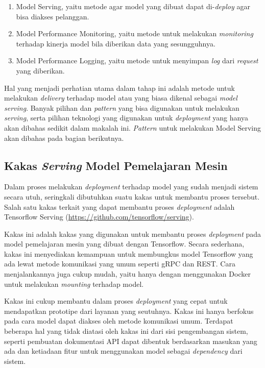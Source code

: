 \begin{enumerate}
  \item Model Serving, yaitu metode agar model yang dibuat dapat di-\textit{deploy} agar bisa diakses pelanggan.
  \item Model Performance Monitoring, yaitu metode untuk melakukan \textit{monitoring} terhadap kinerja model bila diberikan data yang sesungguhnya.
  \item Model Performance Logging, yaitu metode untuk menyimpan \textit{log} dari \textit{request} yang diberikan.
\end{enumerate}

Hal yang menjadi perhatian utama dalam tahap ini adalah metode untuk melakukan \textit{delivery} terhadap model atau yang biasa dikenal sebagai \textit{model serving}.
Banyak pilihan dan \textit{pattern} yang bisa digunakan untuk melakukan \textit{serving}, serta pilihan teknologi yang digunakan untuk \textit{deployment} yang hanya akan dibahas sedikit dalam makalah ini.
\textit{Pattern} untuk melakukan Model Serving akan dibahas pada bagian berikutnya.

\subsection{Kakas \textit{Serving} Model Pemelajaran Mesin}

Dalam proses melakukan \textit{deployment} terhadap model yang sudah menjadi sistem secara utuh, seringkali dibutuhkan suatu kakas untuk membantu proses tersebut.
Salah satu kakas terkait yang dapat membantu proses \textit{deployment} adalah Tensorflow Serving (\href{https://github.com/tensorflow/serving}{https://github.com/tensorflow/serving}).

Kakas ini adalah kakas yang digunakan untuk membantu proses \textit{deployment} pada model pemelajaran mesin yang dibuat dengan Tensorflow.
Secara sederhana, kakas ini menyediakan kemampuan untuk membungkus model Tensorflow yang ada lewat metode komunikasi yang umum seperti gRPC dan REST.\@
Cara menjalankannya juga cukup mudah, yaitu hanya dengan menggunakan Docker untuk melakukan \textit{mounting} terhadap model.

Kakas ini cukup membantu dalam proses \textit{deployment} yang cepat untuk mendapatkan prototipe dari layanan yang seutuhnya.
Kakas ini hanya berfokus pada cara model dapat diakses oleh metode komunikasi umum.
Terdapat beberapa hal yang tidak diatasi oleh kakas ini dari sisi pengembangan sistem, seperti pembuatan dokumentasi API dapat dibentuk berdasarkan masukan yang ada dan ketiadaan fitur untuk menggunakan model sebagai \textit{dependency} dari sistem.
